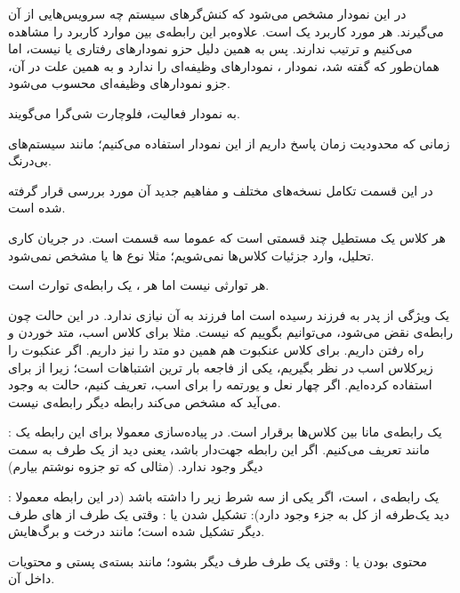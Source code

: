  در این نمودار مشخص می‌شود که کنش‌گرهای سیستم چه سرویس‌هایی از آن می‌گیرند. هر مورد کاربرد یک  است. 
علاوه‌بر این رابطه‌ی بین موارد کاربرد را مشاهده می‌کنیم و ترتیب ندارند. پس به همین دلیل حزو نمودارهای رفتاری یا  نیست، اما همان‌طور که گفته شد، نمودار ، نمودارهای وظیفه‌ای را ندارد و به همین علت در آن، جزو نمودارهای وظیفه‌ای محسوب می‌شود.

 به نمودار فعالیت، فلوچارت شی‌گرا می‌گویند.

 زمانی که محدودیت زمان پاسخ داریم از این نمودار استفاده می‌کنیم؛ مانند سیستم‌های بی‌درنگ.

در این قسمت تکامل نسخه‌های مختلف  و مفاهیم جدید آن مورد بررسی قرار گرفته شده است.

هر کلاس یک مستطیل چند قسمتی است که عموما سه قسمت است. در جریان کاری تحلیل، وارد جزئیات کلاس‌ها نمی‌شویم؛ مثلا نوع ها یا  مشخص نمی‌شود.

 هر توارثی  نیست اما هر ، یک رابطه‌ی توارث است. 

 یک ویژگی از پدر به فرزند رسیده است اما فرزند به آن نیازی ندارد. در این حالت چون رابطه‌ی  نقض می‌شود، می‌توانیم بگوییم که  نیست. مثلا برای کلاس اسب، متد خوردن و راه رفتن داریم. برای کلاس عنکبوت هم همین دو متد را نیز داریم. اگر عنکبوت را زیرکلاس اسب در نظر بگیریم، یکی از فاجعه بار ترین اشتباهات است؛ زیرا از  برای  استفاده کرده‌ایم. اگر چهار نعل و یورتمه را برای اسب، تعریف کنیم، حالت  به وجود می‌آید که مشخص می‌کند رابطه دیگر رابطه‌ی  نیست.

: یک رابطه‌ی مانا بین کلاس‌ها برقرار است. در پیاده‌سازی معمولا برای این رابطه یک  مانند  تعریف می‌کنیم. اگر این رابطه جهت‌دار باشد، یعنی دید از یک طرف به سمت دیگر وجود ندارد. (مثالی که تو جزوه نوشتم بیارم)

: یک رابطه‌ی ،  است،‌ اگر یکی از سه شرط زیر را داشته باشد (در این رابطه معمولا دید یک‌طرفه از کل به جزء وجود دارد):
 تشکیل شدن یا : وقتی یک طرف از های طرف دیگر تشکیل شده است؛ مانند درخت و برگ‌هایش.

 محتوی بودن یا :  وقتی یک طرف  طرف دیگر بشود؛ مانند بسته‌ی پستی و محتویات داخل آن.

